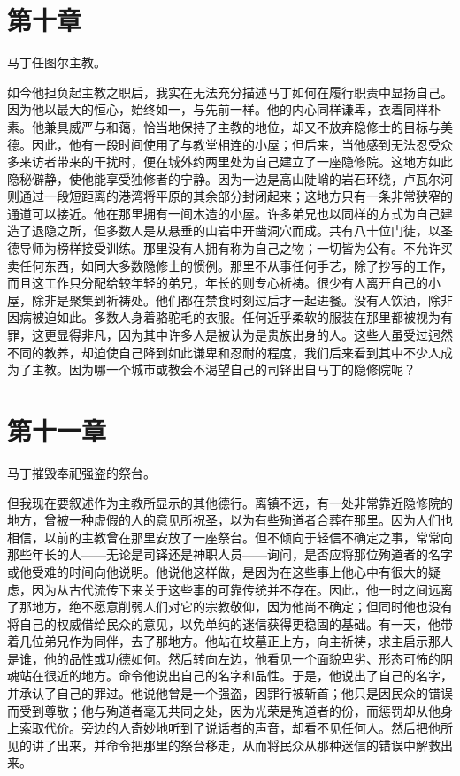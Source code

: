 \section{第十章}

马丁任图尔主教。\par

如今他担负起主教之职后，我实在无法充分描述马丁如何在履行职责中显扬自己。因为他以最大的恒心，始终如一，与先前一样。他的内心同样谦卑，衣着同样朴素。他兼具威严与和蔼，恰当地保持了主教的地位，却又不放弃隐修士的目标与美德。因此，他有一段时间使用了与教堂相连的小屋；但后来，当他感到无法忍受众多来访者带来的干扰时，便在城外约两里处为自己建立了一座隐修院。这地方如此隐秘僻静，使他能享受独修者的宁静。因为一边是高山陡峭的岩石环绕，卢瓦尔河则通过一段短距离的港湾将平原的其余部分封闭起来；这地方只有一条非常狭窄的通道可以接近。他在那里拥有一间木造的小屋。许多弟兄也以同样的方式为自己建造了退隐之所，但多数人是从悬垂的山岩中开凿洞穴而成。共有八十位门徒，以圣德导师为榜样接受训练。那里没有人拥有称为自己之物；一切皆为公有。不允许买卖任何东西，如同大多数隐修士的惯例。那里不从事任何手艺，除了抄写的工作，而且这工作只分配给较年轻的弟兄，年长的则专心祈祷。很少有人离开自己的小屋，除非是聚集到祈祷处。他们都在禁食时刻过后才一起进餐。没有人饮酒，除非因病被迫如此。多数人身着骆驼毛的衣服。任何近乎柔软的服装在那里都被视为有罪，这更显得非凡，因为其中许多人是被认为是贵族出身的人。这些人虽受过迥然不同的教养，却迫使自己降到如此谦卑和忍耐的程度，我们后来看到其中不少人成为了主教。因为哪一个城市或教会不渴望自己的司铎出自马丁的隐修院呢？\par


\section{第十一章}

马丁摧毁奉祀强盗的祭台。\par

但我现在要叙述作为主教所显示的其他德行。离镇不远，有一处非常靠近隐修院的地方，曾被一种虚假的人的意见所祝圣，以为有些殉道者合葬在那里。因为人们也相信，以前的主教曾在那里安放了一座祭台。但不倾向于轻信不确定之事，常常向那些年长的人——无论是司铎还是神职人员——询问，是否应将那位殉道者的名字或他受难的时间向他说明。他说他这样做，是因为在这些事上他心中有很大的疑虑，因为从古代流传下来关于这些事的可靠传统并不存在。因此，他一时之间远离了那地方，绝不愿意削弱人们对它的宗教敬仰，因为他尚不确定；但同时他也没有将自己的权威借给民众的意见，以免单纯的迷信获得更稳固的基础。有一天，他带着几位弟兄作为同伴，去了那地方。他站在坟墓正上方，向主祈祷，求主启示那人是谁，他的品性或功德如何。然后转向左边，他看见一个面貌卑劣、形态可怖的阴魂站在很近的地方。命令他说出自己的名字和品性。于是，他说出了自己的名字，并承认了自己的罪过。他说他曾是一个强盗，因罪行被斩首；他只是因民众的错误而受到尊敬；他与殉道者毫无共同之处，因为光荣是殉道者的份，而惩罚却从他身上索取代价。旁边的人奇妙地听到了说话者的声音，却看不见任何人。然后把他所见的讲了出来，并命令把那里的祭台移走，从而将民众从那种迷信的错误中解救出来。\par

